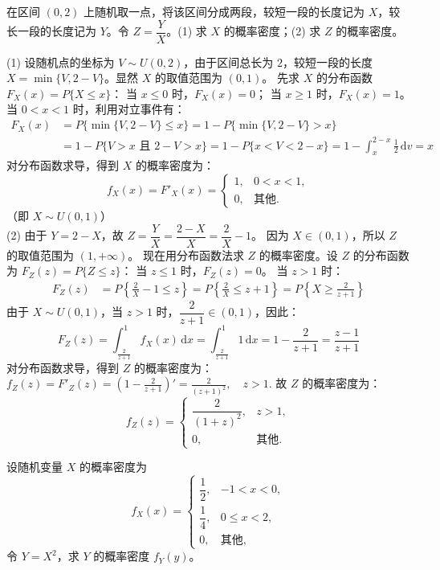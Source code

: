\documentclass[lang=cn,11pt]{elegantbook}
\begin{document}
\begin{exercise}[分段随机变量的函数] \label{exer:2-21}
在区间 $(0,2)$ 上随机取一点，将该区间分成两段，较短一段的长度记为 $X$，较长一段的长度记为 $Y$。令 $Z = \dfrac{Y}{X}$。(1) 求 $X$ 的概率密度；(2) 求 $Z$ 的概率密度。
\end{exercise}
\begin{solution}
(1) 设随机点的坐标为 $V \sim U(0,2)$，由于区间总长为 $2$，较短一段的长度 $X = \min\{V, 2-V\}$。显然 $X$ 的取值范围为 $(0,1)$。
先求 $X$ 的分布函数 $F_X(x) = P\{X \le x\}$：
当 $x \le 0$ 时，$F_X(x) = 0$；
当 $x \ge 1$ 时，$F_X(x) = 1$。
当 $0 < x < 1$ 时，利用对立事件有：
\[
\begin{aligned}
F_X(x) &= P\{\min\{V, 2-V\} \le x\} = 1 - P\{\min\{V, 2-V\} > x\} \\
&= 1 - P\{V > x \text{ 且 } 2-V > x\} = 1 - P\{x < V < 2-x\}=1-\int_{x}^{2-x} \frac{1}{2} \,\mathrm{d}v=x
\end{aligned}
\]
对分布函数求导，得到 $X$ 的概率密度为：
\[
f_X(x) = F'_X(x) = \begin{cases}
1, & 0 < x < 1, \\
0, & \text{其他}.
\end{cases}
\]
（即 $X \sim U(0,1)$）\\
(2) 由于 $Y = 2 - X$，故 $Z = \dfrac{Y}{X} = \dfrac{2-X}{X} = \dfrac{2}{X} - 1$。
因为 $X \in (0,1)$，所以 $Z$ 的取值范围为 $(1, +\infty)$。
现在用分布函数法求 $Z$ 的概率密度。设 $Z$ 的分布函数为 $F_Z(z) = P\{Z \le z\}$：
当 $z \le 1$ 时，$F_Z(z) = 0$。
当 $z > 1$ 时：
\[
\begin{aligned}
F_Z(z) &= P\left\{\frac{2}{X} - 1 \le z\right\} = P\left\{\frac{2}{X} \le z + 1\right\} = P\left\{X \ge \frac{2}{z+1}\right\}
\end{aligned}
\]
由于 $X \sim U(0,1)$，当 $z > 1$ 时，$\dfrac{2}{z+1} \in (0, 1)$，因此：
\[
F_Z(z) = \int_{\frac{2}{z+1}}^{1} f_X(x) \,\mathrm{d}x = \int_{\frac{2}{z+1}}^{1} 1 \,\mathrm{d}x = 1 - \frac{2}{z+1} = \frac{z-1}{z+1}
\]
对分布函数求导，得到 $Z$ 的概率密度为：
\(
f_Z(z) = F'_Z(z) = \left( 1 - \frac{2}{z+1} \right)' = \frac{2}{(z+1)^2}, \quad z > 1.
\)
故 $Z$ 的概率密度为：
\[
f_Z(z) = \begin{cases}
\dfrac{2}{(1+z)^2}, & z > 1, \\
0, & \text{其他}.
\end{cases}
\]
\end{solution}

\begin{exercise}[分段密度函数的变换] \label{exer:2-22}
设随机变量 $X$ 的概率密度为
\[
f_X(x) = \begin{cases}
\dfrac{1}{2}, & -1 < x < 0, \\
\dfrac{1}{4}, & 0 \le x < 2, \\
0, & \text{其他},
\end{cases}
\]
令 $Y = X^2$，求 $Y$ 的概率密度 $f_Y(y)$。
\end{exercise}
\end{document}
